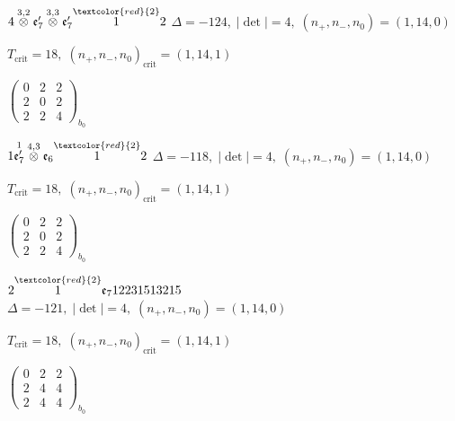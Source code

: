 \documentclass[10pt]{article}
\begin{document}
\smallskip

$4\overset{3,2}{\otimes}\mathfrak{e}_7'\overset{3,3}{\otimes}\mathfrak{e}_7'\overset{\textcolor{red}{2}}{1}2$ \quad $\Delta=-124,\; |\det|=4,\; (n_+,n_-,n_0)=(1,14,0)$

\hspace{1em}$T_{\text{crit}}=18,\; (n_+,n_-,n_0)_{\text{crit}}=(1,14,1)$

\hspace{2em}$\left(\begin{smallmatrix}0 & 2 & 2 \\ 2 & 0 & 2 \\ 2 & 2 & 4\end{smallmatrix}\right)_{\!b_0}$

\smallskip

$1\overset{1}{\mathfrak{e}_7'}\overset{4,3}{\otimes}\mathfrak{e}_6\overset{\textcolor{red}{2}}{1}2$ \quad $\Delta=-118,\; |\det|=4,\; (n_+,n_-,n_0)=(1,14,0)$

\hspace{1em}$T_{\text{crit}}=18,\; (n_+,n_-,n_0)_{\text{crit}}=(1,14,1)$

\hspace{2em}$\left(\begin{smallmatrix}0 & 2 & 2 \\ 2 & 0 & 2 \\ 2 & 2 & 4\end{smallmatrix}\right)_{\!b_0}$

\smallskip

$2\overset{\textcolor{red}{2}}{1}\mathfrak{e}_712231513215$ \quad $\Delta=-121,\; |\det|=4,\; (n_+,n_-,n_0)=(1,14,0)$

\hspace{1em}$T_{\text{crit}}=18,\; (n_+,n_-,n_0)_{\text{crit}}=(1,14,1)$

\hspace{2em}$\left(\begin{smallmatrix}0 & 2 & 2 \\ 2 & 4 & 4 \\ 2 & 4 & 4\end{smallmatrix}\right)_{\!b_0}$

\smallskip
\end{document}
